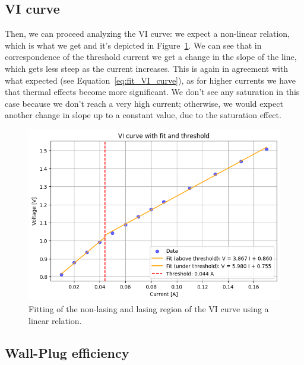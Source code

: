 \documentclass[prl,twocolumn]{revtex4-1}
\begin{document}
\subsection{VI curve}
Then, we can proceed analyzing the VI curve: we expect a non-linear relation, which is what we get and it's depicted in Figure~\ref{fig:VI_curve_fit}. We can see that in correspondence of the threshold current we get a change in the slope of the line, which gets less steep as the current increases. This is again in agreement with what expected (see Equation~\eqref{eq:fit_VI_curve}), as for higher currents we have that thermal effects become more significant. We don't see any saturation in this case because we don't reach a very high current; otherwise, we would expect another change in slope up to a constant value, due to the saturation effect.

\begin{figure}[!t]
    \centering
    \includegraphics[width=\linewidth]{Images/VI_curve_fit.png}
    \caption{Fitting of the non-lasing and lasing region of the VI curve using a linear relation.}
    \label{fig:VI_curve_fit}
\end{figure}


\subsection{Wall-Plug efficiency}
\end{document}
